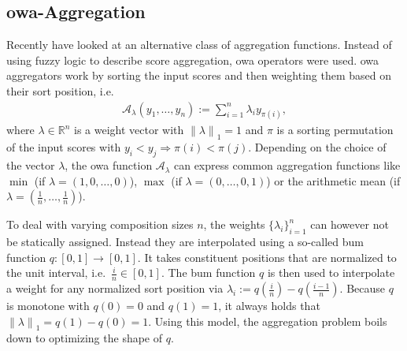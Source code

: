 \subsection{\acs*{owa}-Aggregation}%
\label{sec:related:lta:owa}

Recently \citet{Melnikov2019} have looked at an alternative class of aggregation functions.
Instead of using fuzzy logic to describe score aggregation, \ac{owa} operators were used.
\ac{owa} aggregators work by sorting the input scores and then weighting them based on their sort position, i.e.\ %
\begin{align}
	\mathcal{A}_{\lambda}(y_1, \dots, y_n) := \sum_{i = 1}^n \lambda_i y_{\pi(i)},
\end{align}
where $\lambda \in \mathbb{R}^n$ is a weight vector with ${\|\lambda\|}_1 = 1$ and $\pi$ is a sorting permutation of the input scores with $y_i < y_j \Rightarrow \pi(i) < \pi(j)$. %
Depending on the choice of the vector $\lambda$, the \ac{owa} function $\mathcal{A}_\lambda$ can express common aggregation functions like
$\min$ (if $\lambda = (1, 0, \dots, 0)$),
$\max$ (if $\lambda = (0, \dots, 0, 1)$)
or the arithmetic mean (if $\lambda = \left(\frac{1}{n}, \dots, \frac{1}{n}\right)$).

To deal with varying composition sizes $n$, the weights ${\{ \lambda_i \}}_{i = 1}^{n}$ can however not be statically assigned.
Instead they are interpolated using a so-called \ac{bum} function $q: [0, 1] \to [0, 1]$.
It takes constituent positions that are normalized to the unit interval, i.e.\ $\frac{i}{n} \in [0, 1]$.
The \ac{bum} function $q$ is then used to interpolate a weight for any normalized sort position via $\lambda_i := q\left(\frac{i}{n}\right) - q\left(\frac{i - 1}{n}\right)$.
Because $q$ is monotone with $q(0) = 0$ and $q(1) = 1$, it always holds that ${\|\lambda\|}_1 = q(1) - q(0) = 1$. %
Using this model, the aggregation problem boils down to optimizing the shape of $q$.

